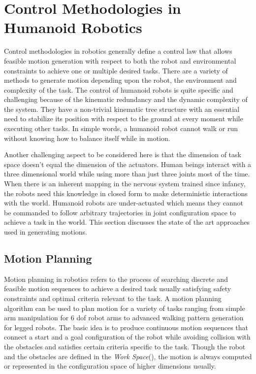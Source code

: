 \section{Control Methodologies in Humanoid Robotics}
\label{sec:control_methods}
Control methodologies in robotics generally define a control law that allows feasible motion generation with respect to both the robot and environmental constraints to achieve one or multiple desired tasks. There are a variety of methods to generate motion depending upon the robot, the environment and complexity of the task. The control of humanoid robots is quite specific and challenging because of the kinematic redundancy and the dynamic complexity of the system. They have a non-trivial kinematic tree structure with an essential need to stabilize its position with respect to the ground at every moment while executing other tasks. In simple words, a humanoid robot cannot walk or run without knowing how to balance itself while in motion. 

Another challenging aspect to be considered here is that the dimension of task space doesn't equal the dimension of the actuators. Human beings interact with a three dimensional world while using more than just three joints most of the time. When there is an inherent mapping in the nervous system trained since infancy, the robots need this knowledge in closed form to make deterministic interactions with the world. Humanoid robots are under-actuated which means they cannot be commanded to follow arbitrary trajectories in joint configuration space to achieve a task in the world. This section discusses the state of the art 
approaches used in generating motions.

\subsection{Motion Planning}
Motion planning in robotics refers to the process of searching discrete and feasible motion sequences to achieve a desired task usually satisfying safety constraints and optimal criteria relevant to the task. A motion planning algorithm can be used to plan motion for a variety of tasks ranging from simple arm manipulation for 6 dof robot arms to advanced walking pattern generation for legged robots. The basic idea is to produce continuous motion sequences that connect a start and a goal configuration of the robot while avoiding collision with the obstacles and satisfies certain criteria specific to the task. Though the robot and the obstacles are defined in the \textit{Work Space}(\WS), the motion is always computed or represented in the configuration space of higher dimensions usually.  

